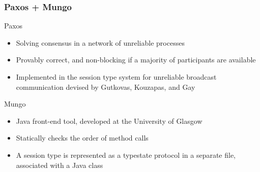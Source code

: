 \begin{frame}\frametitle{Paxos + Mungo}
  \begin{alertblock}{Paxos}
    \begin{itemize}
      \item Solving consensus in a network of unreliable processes
      \item Provably correct, and non-blocking if a majority of participants are available
      \item Implemented in the session type system for unreliable broadcast communication devised by Gutkovas, Kouzapas, and Gay
    \end{itemize}
  \end{alertblock}
  \begin{alertblock}{Mungo}
    \begin{itemize}
      \item Java front-end tool, developed at the University of Glasgow
      \item Statically checks the order of method calls
      \item A session type is represented as a typestate protocol in a separate file, associated with a Java class
    \end{itemize}
  \end{alertblock}

\end{frame}
